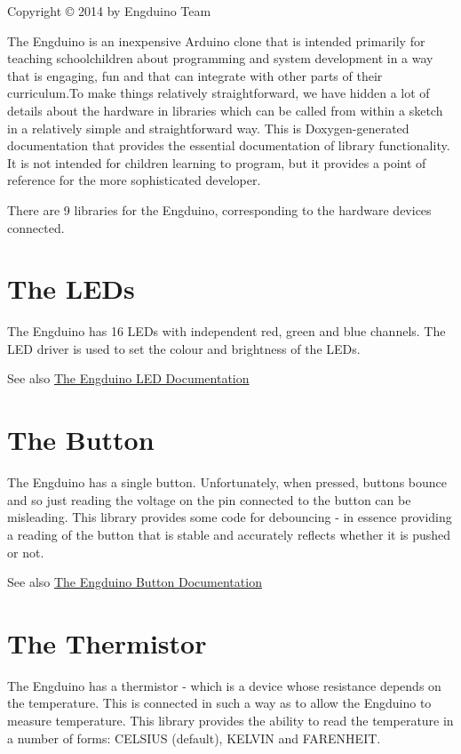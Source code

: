 \begin{center}Copyright \copyright{} 2014 by Engduino Team \end{center} 

The Engduino is an inexpensive Arduino clone that is intended primarily for teaching schoolchildren about programming and system development in a way that is engaging, fun and that can integrate with other parts of their curriculum.\+To make things relatively straightforward, we have hidden a lot of details about the hardware in libraries which can be called from within a sketch in a relatively simple and straightforward way. This is Doxygen-\/generated documentation that provides the essential documentation of library functionality. It is not intended for children learning to program, but it provides a point of reference for the more sophisticated developer.

There are 9 libraries for the Engduino, corresponding to the hardware devices connected.\hypertarget{index_LEDs}{}\section{The L\+E\+Ds}\label{index_LEDs}
The Engduino has 16 L\+E\+Ds with independent red, green and blue channels. The L\+E\+D driver is used to set the colour and brightness of the L\+E\+Ds.

\begin{DoxySeeAlso}{See also}
\hyperlink{class_engduino_l_e_ds_class}{The Engduino L\+E\+D Documentation }
\end{DoxySeeAlso}
\hypertarget{index_Button}{}\section{The Button}\label{index_Button}
The Engduino has a single button. Unfortunately, when pressed, buttons bounce and so just reading the voltage on the pin connected to the button can be misleading. This library provides some code for \textquotesingle{}debouncing\textquotesingle{} -\/ in essence providing a reading of the button that is stable and accurately reflects whether it is pushed or not.

\begin{DoxySeeAlso}{See also}
\hyperlink{class_engduino_button_class}{The Engduino Button Documentation }
\end{DoxySeeAlso}
\hypertarget{index_Thermistor}{}\section{The Thermistor}\label{index_Thermistor}
The Engduino has a thermistor -\/ which is a device whose resistance depends on the temperature. This is connected in such a way as to allow the Engduino to measure temperature. This library provides the ability to read the temperature in a number of forms\+: C\+E\+L\+S\+I\+U\+S (default), K\+E\+L\+V\+I\+N and F\+A\+R\+E\+N\+H\+E\+I\+T.

